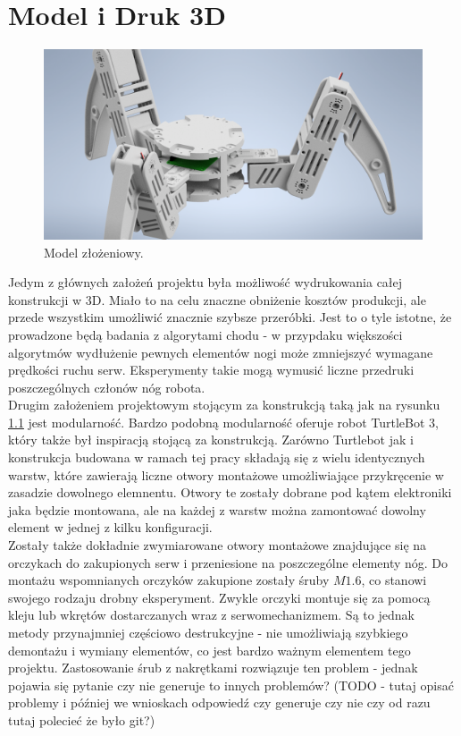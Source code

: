 \chapter{Model i Druk 3D}
\begin{figure}[h!]
\includegraphics[width=\textwidth]{img/CAD_assembly.png}
\caption{Model złożeniowy.}
\label{CAD_assembly}
\end{figure}
Jedym z głównych założeń projektu była możliwość wydrukowania całej konstrukcji w 3D. Miało to na celu znaczne obniżenie kosztów produkcji, ale przede wszystkim umożliwić znacznie szybsze przeróbki. Jest to o tyle istotne, że prowadzone będą badania z algorytami chodu - w przypdaku większości algorytmów wydłużenie pewnych elementów nogi może zmniejszyć wymagane prędkości ruchu serw. Eksperymenty takie mogą wymusić liczne przedruki poszczególnych członów nóg robota.\\

Drugim założeniem projektowym stojącym za konstrukcją taką jak na rysunku \ref{CAD_assembly} jest modularność. Bardzo podobną modularność oferuje robot TurtleBot 3, który także był inspiracją stojącą za konstrukcją. Zarówno Turtlebot jak i konstrukcja budowana w ramach tej pracy składają się z wielu identycznych warstw, które zawierają liczne otwory montażowe umożliwiające przykręcenie w zasadzie dowolnego elemnentu. Otwory te zostały dobrane pod kątem elektroniki jaka będzie montowana, ale na każdej z warstw można zamontować dowolny element w jednej z kilku konfiguracji.\\

Zostały także dokładnie zwymiarowane otwory montażowe znajdujące się na orczykach do zakupionych serw i przeniesione na poszczególne elementy nóg. Do montażu wspomnianych orczyków zakupione zostały śruby $M1.6$, co stanowi swojego rodzaju drobny eksperyment. Zwykle orczyki montuje się za pomocą kleju lub wkrętów dostarczanych wraz z serwomechanizmem. Są to jednak metody przynajmniej częściowo destrukcyjne - nie umożliwiają szybkiego demontażu i wymiany elementów, co jest bardzo ważnym elementem tego projektu. Zastosowanie śrub z nakrętkami rozwiązuje ten problem - jednak pojawia się pytanie czy nie generuje to innych problemów? (TODO - tutaj opisać problemy i później we wnioskach odpowiedź czy generuje czy nie czy od razu tutaj polecieć że było git?)\\

